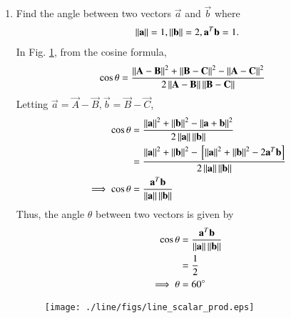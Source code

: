 \begin{enumerate}[label=\arabic*.,ref=\thesubsection.\theenumi]
%
%
\item Find the angle between two vectors $\vec{a}$ and $\vec{b}$ where 
%
\begin{align}
\left\lVert\mathbf{a}\right\rVert = 1,
\left\lVert\mathbf{b}\right\rVert = 2,
\mathbf{a}^T\mathbf{b} = 1.
\end{align}
%
\solution In Fig. \ref{fig:line_scalar_prod}, from the cosine formula, 
%
\begin{align}
\cos \theta &= \frac{\left\lVert\mathbf{A}-\mathbf{B}\right\rVert^2+\left\lVert\mathbf{B}-\mathbf{C}\right\rVert^2-\left\lVert\mathbf{A}-\mathbf{C}\right\rVert^2}{2\left\lVert\mathbf{A}-\mathbf{B}\right\rVert\left\lVert\mathbf{B}-\mathbf{C}\right\rVert}
\end{align}
Letting $\vec{a} = \vec{A}-\vec{B}, \vec{b} = \vec{B}-\vec{C}$, 
\begin{align}
\cos \theta &= \frac{\left\lVert\mathbf{a}\right\rVert^2+\left\lVert\mathbf{b}\right\rVert^2-\left\lVert\mathbf{a}+\mathbf{b}\right\rVert^2}{2\left\lVert\mathbf{a}\right\rVert\left\lVert\mathbf{b}\right\rVert}
\\
&= \frac{\left\lVert\mathbf{a}\right\rVert^2+\left\lVert\mathbf{b}\right\rVert^2-{}\left[\left\lVert\mathbf{a}\right\rVert^2+\left\lVert\mathbf{b}\right\rVert^2-2\mathbf{a}^T\mathbf{b}\right]}{2\left\lVert\mathbf{a}\right\rVert\left\lVert\mathbf{b}\right\rVert}
\\
\implies \cos \theta &=\frac{\mathbf{a}^T\mathbf{b}}{\left\lVert\mathbf{a}\right\rVert\left\lVert\mathbf{b}\right\rVert}
\end{align}
%
Thus, the angle $\theta$ between two vectors is given by 
%
\begin{align}
\label{eq:line_scalar_prod}
\cos \theta &= \frac{\mathbf{a}^T\mathbf{b}}{\left\lVert\mathbf{a}\right\rVert\left\lVert\mathbf{b}\right\rVert}
\\
&=\frac{1}{2}
\\
\implies \theta &= 60\degree
\end{align}
%
\begin{figure}[!ht]
\texttt{[image: ./line/figs/line\_scalar\_prod.eps]}
\caption{}
\label{fig:line_scalar_prod}
\end{figure}
%



\end{enumerate}
